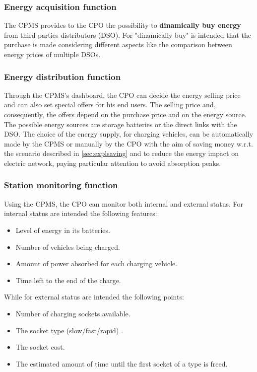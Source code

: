 \subsubsection{Energy acquisition function}
The CPMS provides to the CPO the possibility to \textbf{dinamically buy energy} from third parties distributors (DSO). For "dinamically buy" is intended that the purchase is made considering different aspects like the comparison between energy prices of multiple DSOs.  
\subsubsection{Energy distribution function}
Through the CPMS's dashboard, the CPO can decide the energy selling price and can also set special offers for his end users. The selling price and, consequently, the offers depend on the purchase price and on the energy source. The possible energy sources are storage batteries or the direct links with the DSO. The choice of the energy supply, for charging vehicles, can be automatically made by the CPMS or manually by the CPO with the aim of saving money w.r.t. the scenario described in \ref{sec:explsaving} and to reduce the energy impact on electric network, paying particular attention to avoid absorption peaks.
\subsubsection{Station monitoring function}
Using the CPMS, the CPO can monitor both internal and external status. For internal status are intended the following features: 
\begin{itemize}
    \item Level of energy in its batteries.
    \item Number of vehicles being charged.
    \item Amount of power absorbed for each charging vehicle.
    \item Time left to the end of the charge.
\end{itemize}
While for external status are intended the following points:
\begin{itemize}
    \item Number of charging sockets available.
    \item The socket type (slow/fast/rapid) .
    \item The socket cost.
    \item The estimated amount of time until the first socket of a type is freed.
\end{itemize}
